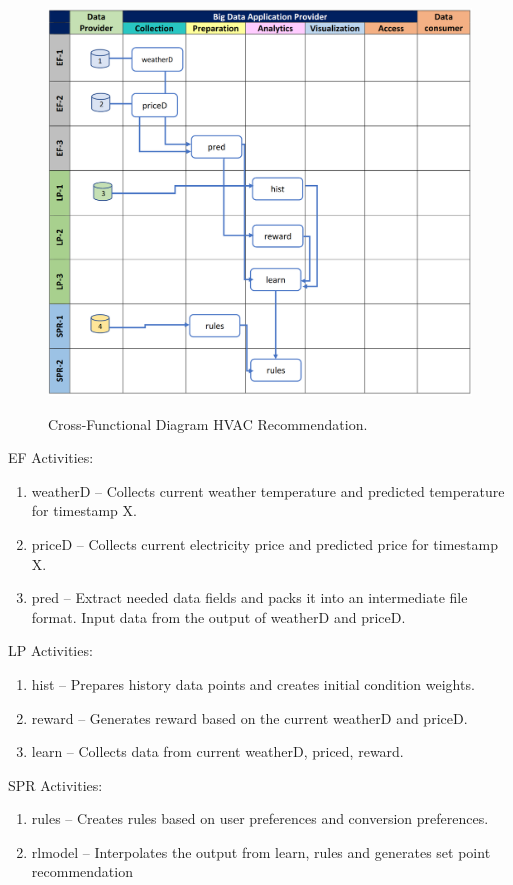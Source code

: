 \begin{figure}[htb]
\centering\includegraphics[width=1.0\columnwidth]{usecase/hvac-2.png}
\label{fig:hvac-2}
\caption{Cross-Functional Diagram HVAC Recommendation.}
\end{figure}


EF Activities:

\begin{enumerate}
\item weatherD -- Collects current weather temperature and predicted temperature for timestamp
X.
\item priceD -- Collects current electricity price and predicted price for timestamp X.
\item pred -- Extract needed data fields and packs it into an intermediate file format. Input data
from the output of weatherD and priceD.
\end{enumerate}


LP Activities:

\begin{enumerate}
\item hist -- Prepares history data points and creates initial condition weights.
\item reward -- Generates reward based on the current weatherD and priceD.
\item learn -- Collects data from current weatherD, priced, reward.
\end{enumerate}

SPR Activities:

\begin{enumerate}
\item rules -- Creates rules based on user preferences and conversion preferences.
\item rlmodel --  Interpolates the output from learn, rules and generates set point recommendation
\end{enumerate}



